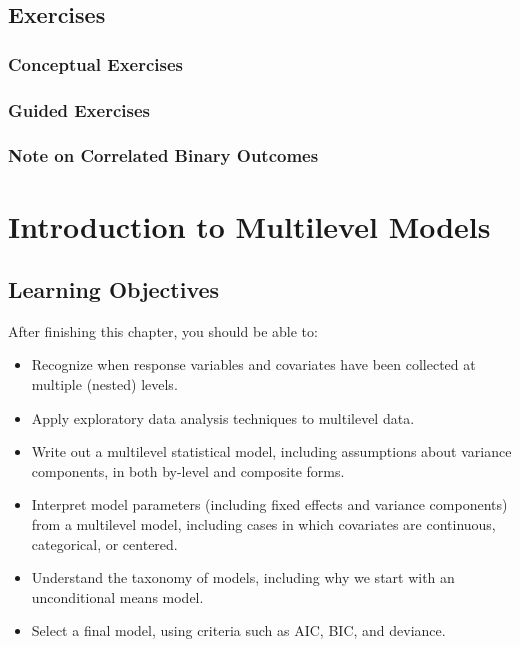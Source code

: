 \documentclass[
]{krantz}
\providecommand{\tightlist}{%
  \setlength{\itemsep}{0pt}\setlength{\parskip}{0pt}}
\begin{document}
\hypertarget{exercises-6}{%
\section{Exercises}\label{exercises-6}}

\hypertarget{conceptual-exercises-4}{%
\subsection{Conceptual Exercises}\label{conceptual-exercises-4}}

\hypertarget{guided-exercises-4}{%
\subsection{Guided Exercises}\label{guided-exercises-4}}

\hypertarget{note-on-correlated-binary-outcomes}{%
\subsection{Note on Correlated Binary Outcomes}\label{note-on-correlated-binary-outcomes}}

\hypertarget{ch-multilevelintro}{%
\chapter{Introduction to Multilevel Models}\label{ch-multilevelintro}}

\hypertarget{learning-objectives-7}{%
\section{Learning Objectives}\label{learning-objectives-7}}

After finishing this chapter, you should be able to:

\begin{itemize}
\tightlist
\item
  Recognize when response variables and covariates have been collected at multiple (nested) levels.
\item
  Apply exploratory data analysis techniques to multilevel data.
\item
  Write out a multilevel statistical model, including assumptions about variance components, in both by-level and composite forms.
\item
  Interpret model parameters (including fixed effects and variance components) from a multilevel model, including cases in which covariates are continuous, categorical, or centered.
\item
  Understand the taxonomy of models, including why we start with an unconditional means model.
\item
  Select a final model, using criteria such as AIC, BIC, and deviance.
\end{itemize}
\end{document}
